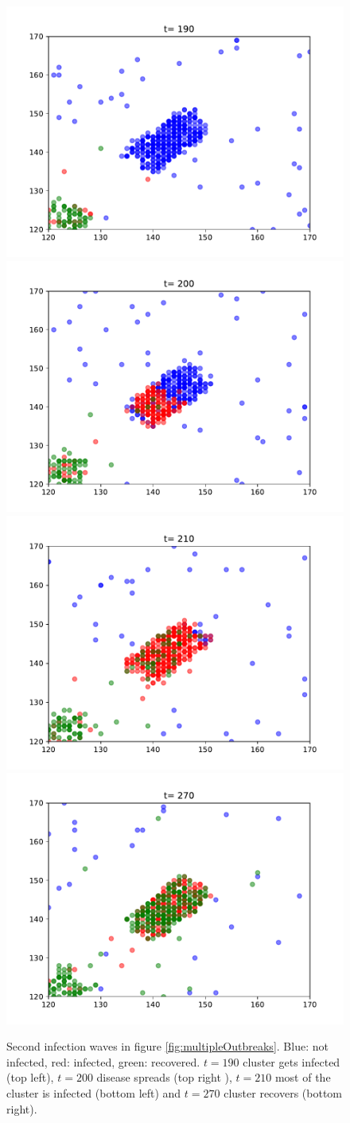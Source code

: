 \begin{figure}[H]
    \includegraphics[width=.24\textwidth]{docs/img/cluster190.pdf}\hfill
    \includegraphics[width=.24\textwidth]{docs/img/cluster200.pdf}\hfill
    \\[\smallskipamount]
    \includegraphics[width=.24\textwidth]{docs/img/cluster210.pdf}\hfill
    \includegraphics[width=.24\textwidth]{docs/img/cluster270.pdf}\hfill
    \caption{Second infection waves in figure \ref{fig:multipleOutbreaks}. Blue: not infected, red: infected, green: recovered. $t = 190$ cluster gets infected (top left), $t = 200$ disease spreads (top right ), $t = 210$ most of the cluster is infected (bottom left) and $t = 270$ cluster recovers (bottom right).}
    \label{fig:clusterInfeciton}
    
\end{figure}
